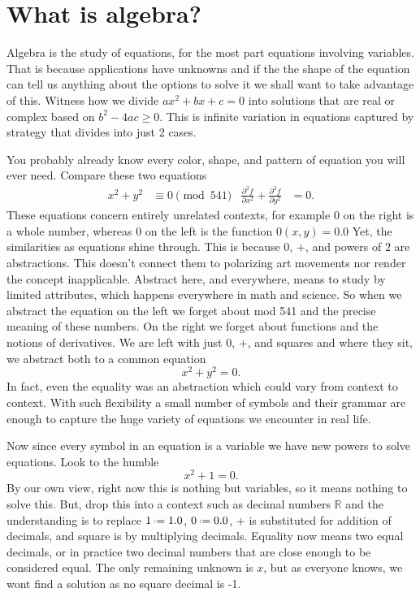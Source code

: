 \chapter{What is algebra?}

Algebra is the study of equations, for the most part equations involving variables.
That is because applications have unknowns and if the
the shape of the equation can tell us anything about the 
options to solve it we shall want to take advantage of this.
Witness how we divide $ax^2+bx+c=0$ into solutions that are 
real or complex based on $b^2-4ac\geq 0$.  This is infinite variation 
in equations captured by strategy that divides into just 2 cases.

You probably already know every color, shape, and pattern of 
equation you will ever need.  Compare these two equations
\begin{align*}
    x^2+y^2 & \equiv 0 \pmod{541} 
    & 
    \frac{\partial^2 f}{\partial x^2}+\frac{\partial^2 f}{\partial y^2} & =0.
\end{align*}
These equations concern entirely unrelated contexts, for example $0$ on the
right is a whole number, whereas $0$ on the left is the function $0(x,y)=0.0$
Yet, the similarities as equations shine through.  This is because $0$, 
$+$, and  powers of $2$ are abstractions.  This doesn't connect them to
polarizing art movements nor render the concept inapplicable.  Abstract here,
and everywhere, means to study by limited attributes, which happens everywhere
in math and science.  So when we abstract the equation on the left we forget
about mod 541 and the precise meaning of these numbers.  On the right we forget
about functions and the notions of derivatives.  We are left with just $0$, 
$+$, and squares and where they sit, we abstract both to a common equation
\[
    x^2+y^2=0.
\]
In fact, even the equality was an abstraction which could vary from context to context.
With such flexibility a small number of symbols and their grammar are enough to capture 
the huge variety of equations we encounter in real life.

Now since every symbol in an equation is a variable we have new powers 
to solve equations.  Look to the humble 
\[
    x^2+1=0.
\]
By our own view, right now this is nothing but variables, so it means nothing to
solve this.  But, drop this into a context such as decimal numbers $\mathbb{R}$
and the understanding is to replace $1\defeq 1.0$, $0\defeq 0.0$, $+$ is
substituted for addition of decimals, and square is by multiplying decimals.
Equality now means two equal decimals, or in practice two decimal numbers that are close enough 
to be considered equal.  The only remaining unknown is $x$, but as everyone 
knows, we wont find a solution as no square decimal is -1.

